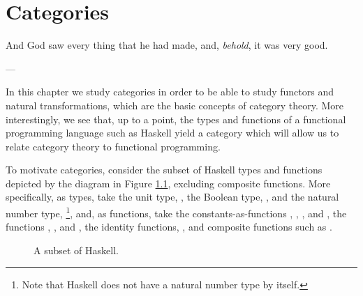 \chapter{Categories}
\label{chap:categories}

\epigraph{
  And God saw every thing that he had made, and, \emph{behold}, it was
  very good.
}{---\textcite[Genesis 1:31]{god-1769}}

In this chapter we study categories in order to be able to study
functors and natural transformations, which are the basic concepts of
category theory. More interestingly, we see that, up to a point, the
types and functions of a functional programming language such as
Haskell yield a category which will allow us to relate category theory
to functional programming.

To motivate categories, consider the subset of Haskell types and
functions depicted by the diagram in Figure
\ref{fig:category-haskell}, excluding composite functions. More
specifically, as types, take the unit type, \texthaskell{()}, the
Boolean type, , and the natural number type,
\footnote{Note that Haskell does not have a natural
  number type by itself.}, and, as functions, take the
constants-as-functions \texthaskell{()}, ,
, and , the functions
, , and , the
identity functions, , and composite functions such as
.

\begin{figure}[htb]
  \begin{center}
  \end{center}
  \caption{A subset of Haskell.}
  \label{fig:category-haskell}
\end{figure}


